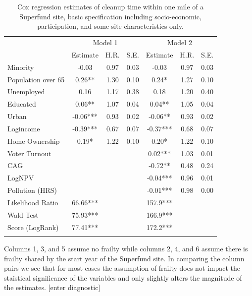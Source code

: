 \documentclass[12pt]{article}
\begin{document}
{\begin{table}[t]
	\centering	\footnotesize
	\caption{\small Cox regression estimates of cleanup time within one mile of a Superfund site, basic specification including socio-economic, participation, and some site characteristics only.} \label{cox1}
	\tabcolsep 9pt
		\begin{tabular}{lccc|ccc}
			\hline 
			& \multicolumn{3}{c}{Model 1 } & \multicolumn{3}{c}{Model 2 } \\ 
			& \multicolumn{1}{c}{Estimate}  & \multicolumn{1}{c}{H.R.}   & \multicolumn{1}{c}{S.E.}   & \multicolumn{1}{c}{Estimate}  & \multicolumn{1}{c}{H.R.}   & \multicolumn{1}{c}{S.E.}\\ \hline
			Minority & -0.03 & 0.97  & 0.03  & -0.03 & 0.97  & 0.03 \\
			Population over 65  &  0.26** & 1.30  & 0.10  &  0.24* & 1.27  & 0.10 \\
			Unemployed & 0.16  & 1.17  & 0.38  & 0.18  & 1.20  & 0.40 \\
			Educated &  0.06** & 1.07  & 0.04  &  0.04** & 1.05  & 0.04 \\
			Urban & -0.06*** & 0.93  & 0.02  & -0.06** & 0.93  & 0.02 \\
			Logincome & -0.39*** & 0.67  & 0.07  & -0.37*** & 0.68  & 0.07 \\
			Home Ownership &  0.19* & 1.22  & 0.10  &  0.20* & 1.22  & 0.10 \\
			Voter Turnout  &       &       &       &  0.02*** & 1.03  & 0.01 \\
			CAG   &       &       &       & -0.72** & 0.48  & 0.24 \\
			LogNPV &       &       &       & -0.04*** & 0.96  & 0.01 \\
			Pollution (HRS) &       &       &       & -0.01*** & 0.98  & 0.00 \\
			\hline
			Likelihood Ratio & 66.66***  & & &
			157.9*** &  & \\ 
			Wald Test & 75.93*** & & &
			166.9*** & & \\
			Score (LogRank) & 77.41*** & & &
			172.2*** &  & \\
			\hline
			\addlinespace[1ex]
			\multicolumn{3}{l}{\textsuperscript{***}$p\leq0.001$, 
				\textsuperscript{**}$p\leq0.01$, 
				\textsuperscript{*}$p\leq0.05$}
	\end{tabular}
\end{table}

Columns 1, 3, and 5 assume no frailty while columns 2, 4, and 6 assume there is frailty shared by the start year of the Superfund site. In comparing the column pairs we see that for most cases the assumption of frailty does not impact the staistical significance of the variables and only slightly alters the magnitude of the estimates. [enter diagnostic]

}
\end{document}
